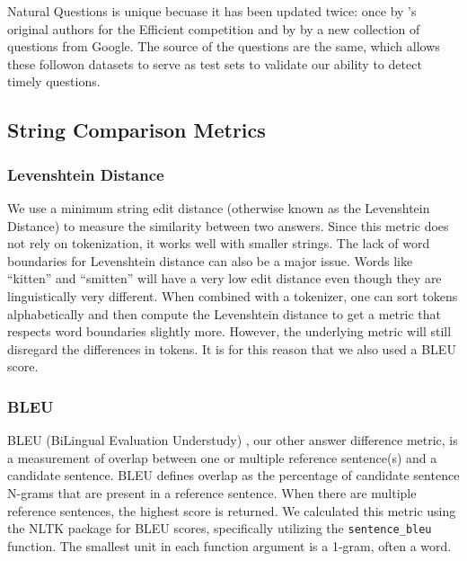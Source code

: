 \documentclass{article}
\begin{document}
Natural Questions is unique becuase it has been updated twice: once by
's original authors for the Efficient  competition and
by  by a new collection of questions from Google.  The source
of the questions are the same, which allows these followon datasets to
serve as test sets to validate our ability to detect timely questions.


\subsection{String Comparison Metrics}
\label{string methods}


\subsubsection{Levenshtein Distance}
\label{fuzzy}

We use a minimum string edit distance (otherwise known as the Levenshtein
Distance) to measure the similarity between two answers. Since this metric does
not rely on tokenization, it works well with smaller strings. The lack of word
boundaries for Levenshtein distance can also be a major issue. Words like
“kitten” and “smitten” will have a very low edit distance even though they are
linguistically very different. When combined with a tokenizer, one can sort
tokens alphabetically and then compute the Levenshtein distance to get a metric
that respects word boundaries slightly more. However, the underlying metric will
still disregard the differences in tokens. It is for this reason that we also
used a BLEU score.


\subsubsection{BLEU}
\label{bleumetric}


BLEU (BiLingual Evaluation Understudy) \cite{bleu}, our other answer difference
metric, is a measurement of overlap between one or multiple reference
sentence(s) and a candidate sentence. BLEU defines overlap as the percentage of
candidate sentence N-grams that are present in a reference sentence. When there
are multiple reference sentences, the highest score is returned. We calculated
this metric using the NLTK \cite{nltk} package for BLEU scores, specifically
utilizing the {\tt sentence\_bleu} function. The smallest unit in each function
argument is a 1-gram, often a word.
\end{document}
